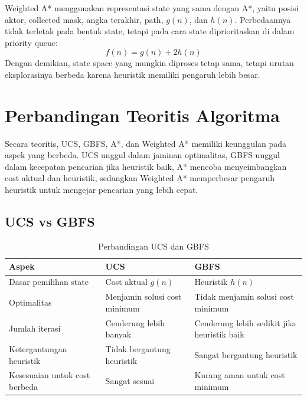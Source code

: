 \begin{tcolorbox}[
	colback=purple!5,
	colframe=purple!60!black,
	title=\textbf{State Space pada Weighted A*},
	arc=2mm,
	boxrule=0.8pt
]
Weighted A* menggunakan representasi state yang sama dengan A*, yaitu posisi aktor, collected mask, angka terakhir, path, $g(n)$, dan $h(n)$. 
Perbedaannya tidak terletak pada bentuk state, tetapi pada cara state diprioritaskan di dalam priority queue:
\[
	f(n)=g(n)+2h(n)
\]
Dengan demikian, state space yang mungkin diproses tetap sama, tetapi urutan eksplorasinya berbeda karena heuristik memiliki pengaruh lebih besar.
\end{tcolorbox}

\section{Perbandingan Teoritis Algoritma}

Secara teoritis, UCS, GBFS, A*, dan Weighted A* memiliki keunggulan pada aspek yang berbeda. 
UCS unggul dalam jaminan optimalitas, GBFS unggul dalam kecepatan pencarian jika heuristik baik, A* mencoba menyeimbangkan cost aktual dan heuristik, sedangkan Weighted A* memperbesar pengaruh heuristik untuk mengejar pencarian yang lebih cepat.

\subsection{UCS vs GBFS}

\begin{table}[H]
	\centering
	\caption{Perbandingan UCS dan GBFS}
	\begin{tabular}{|p{4cm}|p{5cm}|p{5cm}|}
		\hline
		\rowcolor{gray!25}
		\textbf{Aspek} & \textbf{UCS} & \textbf{GBFS} \\
		\hline
		Dasar pemilihan state & Cost aktual $g(n)$ & Heuristik $h(n)$ \\
		\hline
		Optimalitas & Menjamin solusi cost minimum & Tidak menjamin solusi cost minimum \\
		\hline
		Jumlah iterasi & Cenderung lebih banyak & Cenderung lebih sedikit jika heuristik baik \\
		\hline
		Ketergantungan heuristik & Tidak bergantung heuristik & Sangat bergantung heuristik \\
		\hline
		Kesesuaian untuk cost berbeda & Sangat sesuai & Kurang aman untuk cost minimum \\
		\hline
	\end{tabular}
\end{table}

